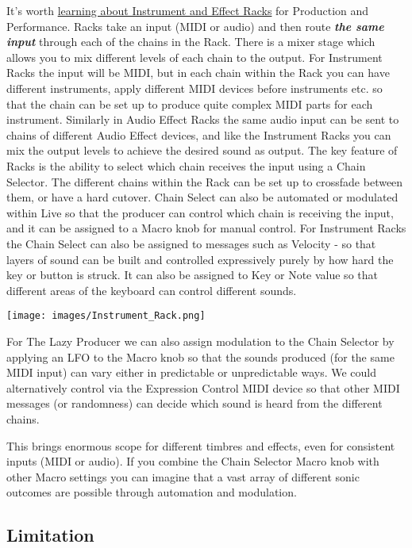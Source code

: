 \documentclass[
  12pt,
  letterpaper,
  oneside,
  open=any]{scrbook}
\begin{document}
It's worth
\href{https://www.ableton.com/en/live-manual/12/instrument-drum-and-effect-racks/\#chain-list}{learning
about Instrument and Effect Racks} for Production and Performance. Racks
take an input (MIDI or audio) and then route \textbf{\emph{the same
input}} through each of the chains in the Rack. There is a mixer stage
which allows you to mix different levels of each chain to the output.
For Instrument Racks the input will be MIDI, but in each chain within
the Rack you can have different instruments, apply different MIDI
devices before instruments etc. so that the chain can be set up to
produce quite complex MIDI parts for each instrument. Similarly in Audio
Effect Racks the same audio input can be sent to chains of different
Audio Effect devices, and like the Instrument Racks you can mix the
output levels to achieve the desired sound as output. The key feature of
Racks is the ability to select which chain receives the input using a
Chain Selector. The different chains within the Rack can be set up to
crossfade between them, or have a hard cutover. Chain Select can also be
automated or modulated within Live so that the producer can control
which chain is receiving the input, and it can be assigned to a Macro
knob for manual control. For Instrument Racks the Chain Select can also
be assigned to messages such as Velocity - so that layers of sound can
be built and controlled expressively purely by how hard the key or
button is struck. It can also be assigned to Key or Note value so that
different areas of the keyboard can control different sounds.

\texttt{[image: images/Instrument\_Rack.png]}

For The Lazy Producer we can also assign modulation to the Chain
Selector by applying an LFO to the Macro knob so that the sounds
produced (for the same MIDI input) can vary either in predictable or
unpredictable ways. We could alternatively control via the Expression
Control MIDI device so that other MIDI messages (or randomness) can
decide which sound is heard from the different chains.

This brings enormous scope for different timbres and effects, even for
consistent inputs (MIDI or audio). If you combine the Chain Selector
Macro knob with other Macro settings you can imagine that a vast array
of different sonic outcomes are possible through automation and
modulation.

\subsection{Limitation}\label{limitation}
\end{document}
